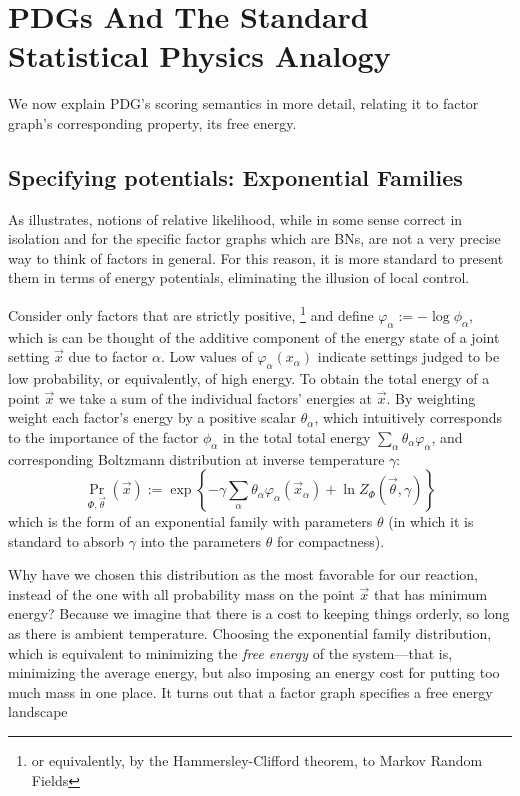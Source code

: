 \documentclass{article}
\numberwithin{equation}{section}
\begin{document}
	\section{PDGs And The Standard Statistical Physics Analogy}
	We now explain PDG's scoring semantics in more detail, relating it to factor graph's corresponding property, its free energy.
	
	\subsection{Specifying potentials: Exponential Families}\label{sec:fg-expfam}
	As  illustrates, notions of relative likelihood, while in some sense correct in isolation and for the specific factor graphs which are BNs, are not a very precise way to think of factors in general. 
	For this reason, it is more standard to present them in terms of energy potentials, eliminating the illusion of local control. 
	
	Consider only factors that are strictly positive,%
		\footnote{or equivalently, by the Hammersley-Clifford theorem, to Markov Random Fields}
	and define $ \varphi_\alpha := -\log \phi_\alpha$, which is can be thought of the additive component of the energy state of a joint setting $\vec x$ due to factor $\alpha$. 
	Low values of $\varphi_\alpha(x_\alpha)$ indicate settings judged to be low probability, or equivalently, of high energy. 
	To obtain the total energy of a point $\vec x$ we take a sum of the individual factors' energies at $\vec x$. By weighting weight each factor's energy by a positive scalar $\theta_\alpha$, which intuitively corresponds to the importance of the factor $\phi_\alpha$ in the total total energy $\sum_\alpha \theta_\alpha \varphi_\alpha$,
	and corresponding Boltzmann distribution at inverse temperature $\gamma$:
	\[ \Pr_{\Phi, \vec\theta} (\vec x)  := \exp \left\{ -\gamma \sum_\alpha \theta_\alpha \varphi_\alpha(\vec x_\alpha)  + \ln Z_\Phi(\vec \theta, \gamma) \right\} \] 
	which is the form of an exponential family with parameters $\theta$ (in which it is standard to absorb $\gamma$ into the parameters $\theta$ for compactness).
	
	Why have we chosen this distribution as the most favorable for our reaction, instead of the one with all probability mass on the point $\vec x$ that has minimum energy? Because we imagine that there is a cost to keeping things orderly, so long as there is ambient temperature. Choosing the exponential family distribution, which is equivalent to minimizing the \emph{free energy} of the system---that is, minimizing the average energy, but also imposing an energy cost for putting too much mass in one place. It turns out that a factor graph specifies a free energy landscape
	
\end{document}
